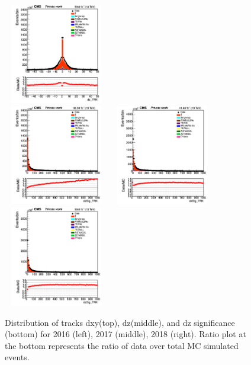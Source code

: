 \documentclass{cernatlasnote}
\begin{document}
\begin{figure}[htp]
 \includegraphics[width=4.6cm, height=4.4cm]{images/emu_channel/2018/18_Range_0pt2_1pt8/track_dz_TRK_Linear.png}\\
\includegraphics[width=4.6cm, height=4.4cm]{images/emu_channel/2016/16_Range_0pt2_1pt8/track_dzSig_TRK_Linear.png}
\includegraphics[width=4.6cm, height=4.4cm]{images/emu_channel/2017/17_Range_0pt2_1pt8/track_dzSig_TRK_Linear.png}
 \includegraphics[width=4.6cm, height=4.4cm]{images/emu_channel/2018/18_Range_0pt2_1pt8/track_dzSig_TRK_Linear.png}\\
  \caption{Distribution of tracks dxy(top), dz(middle), and dz significance (bottom) for 2016 (left), 2017 (middle), 2018 (right). Ratio plot at the bottom represents the ratio of data over total MC simulated events.}
 \label{fig:L0DATAMC}
  \end{figure}
\end{document}
